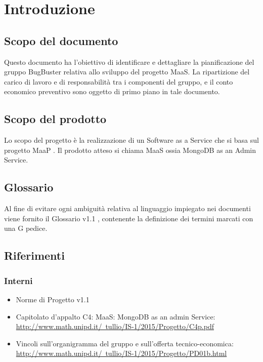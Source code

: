 \section{Introduzione}
\subsection{Scopo del documento}
Questo documento ha l’obiettivo di identificare e dettagliare la pianificazione del gruppo BugBuster
relativa allo sviluppo del progetto MaaS. La ripartizione del carico di lavoro e di responsabilità tra i
componenti del gruppo, e il conto economico preventivo sono oggetto di primo piano in tale documento.

\subsection{Scopo del prodotto}
Lo scopo del progetto è la realizzazione di un Software as a Service che si basa sul progetto MaaP . Il prodotto atteso si chiama MaaS ossia MongoDB as an Admin Service.

\subsection{Glossario}
Al fine di evitare ogni ambiguità relativa al linguaggio impiegato nei documenti viene fornito il Glossario
v1.1 , contenente la definizione dei termini marcati con una G pedice.

\subsection{Riferimenti}
\subsubsection{Interni}
\begin{itemize}
\item Norme di Progetto v1.1
\item Capitolato d'appalto C4: MaaS: MongoDB as an admin Service: \\ \href{http://www.math.unipd.it/~tullio/IS-1/2015/Progetto/C4p.pdf}{http://www.math.unipd.it/~tullio/IS-1/2015/Progetto/C4p.pdf} 
\item Vincoli sull’organigramma del gruppo e sull’offerta tecnico-economica: \\
\href{http://www.math.unipd.it/~tullio/IS-1/2015/Progetto/PD01b.html}{http://www.math.unipd.it/~tullio/IS-1/2015/Progetto/PD01b.html}
\end{itemize}
